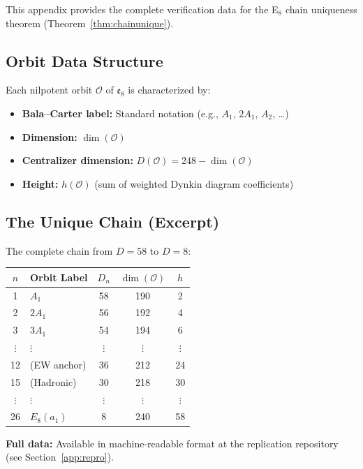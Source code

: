 This appendix provides the complete verification data for the E$_8$ chain uniqueness 
theorem (Theorem~\ref{thm:chainunique}).

\subsection{Orbit Data Structure}

Each nilpotent orbit $\mathcal{O}$ of $\mathfrak{e}_8$ is characterized by:
\begin{itemize}[leftmargin=1.5em, topsep=2pt, itemsep=1pt]
    \item \textbf{Bala--Carter label:} Standard notation (e.g., $A_1$, $2A_1$, $A_2$, \ldots)
    \item \textbf{Dimension:} $\dim(\mathcal{O})$
    \item \textbf{Centralizer dimension:} $D(\mathcal{O}) = 248 - \dim(\mathcal{O})$
    \item \textbf{Height:} $h(\mathcal{O})$ (sum of weighted Dynkin diagram coefficients)
\end{itemize}

\subsection{The Unique Chain (Excerpt)}

The complete chain from $D = 58$ to $D = 8$:

\begin{center}
\small
\begin{tabular}{@{}clccc@{}}
\toprule
$n$ & \textbf{Orbit Label} & $D_n$ & $\dim(\mathcal{O})$ & $h$\\
\midrule
1 & $A_1$ & 58 & 190 & 2\\
2 & $2A_1$ & 56 & 192 & 4\\
3 & $3A_1$ & 54 & 194 & 6\\
$\vdots$ & $\vdots$ & $\vdots$ & $\vdots$ & $\vdots$\\
12 & (EW anchor) & 36 & 212 & 24\\
15 & (Hadronic) & 30 & 218 & 30\\
$\vdots$ & $\vdots$ & $\vdots$ & $\vdots$ & $\vdots$\\
26 & $E_8(a_1)$ & 8 & 240 & 58\\
\bottomrule
\end{tabular}
\end{center}

\textbf{Full data:} Available in machine-readable format at the replication repository 
(see Section~\ref{app:repro}).

